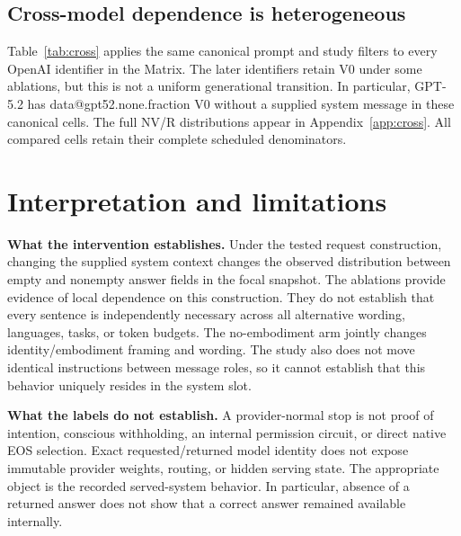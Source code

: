 \documentclass[11pt]{article}
\makeatletter
\newcommand{\D}[1]{\csname data@#1\endcsname}
\makeatother
\begin{document}
\begin{table}[H]
\centering\small

\caption{Recorded controls accompanying the focal comparison. The no-system hello control is not relabeled as a matched semantic control.}
\label{tab:controls}
\end{table}

\subsection{Cross-model dependence is heterogeneous}
Table~\ref{tab:cross} applies the same canonical prompt and study filters to every OpenAI identifier in the Matrix. The later identifiers retain V0 under some ablations, but this is not a uniform generational transition. In particular, GPT-5.2 has \D{gpt52.none.fraction} V0 without a supplied system message in these canonical cells. The full NV/R distributions appear in Appendix~\ref{app:cross}. All compared cells retain their complete scheduled denominators.

\begin{table}[H]
\centering\footnotesize

\caption{V0/N at matched ceiling and parameter track across the Matrix's OpenAI identifiers. ``No output'' abbreviates removal of the output restriction. These columns compare served identifiers, not verified weight-level changes or a chronological training intervention.}
\label{tab:cross}
\end{table}

\section{Interpretation and limitations}
\textbf{What the intervention establishes.} Under the tested request construction, changing the supplied system context changes the observed distribution between empty and nonempty answer fields in the focal snapshot. The ablations provide evidence of local dependence on this construction. They do not establish that every sentence is independently necessary across all alternative wording, languages, tasks, or token budgets. The no-embodiment arm jointly changes identity/embodiment framing and wording. The study also does not move identical instructions between message roles, so it cannot establish that this behavior uniquely resides in the system slot.

\textbf{What the labels do not establish.} A provider-normal stop is not proof of intention, conscious withholding, an internal permission circuit, or direct native EOS selection. Exact requested/returned model identity does not expose immutable provider weights, routing, or hidden serving state. The appropriate object is the recorded served-system behavior. In particular, absence of a returned answer does not show that a correct answer remained available internally.
\end{document}
